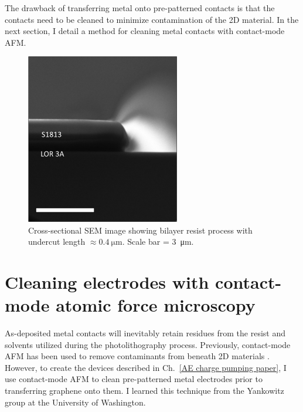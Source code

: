 \documentclass[double,12pt,1in,seploa]{beavtex}
\let\Oldsection\section
\renewcommand{\section}{\FloatBarrier\Oldsection}
\begin{document}
The drawback of transferring metal onto pre-patterned contacts is that the contacts need to be cleaned to minimize contamination of the 2D material. In the next section, I detail a method for cleaning metal contacts with contact-mode AFM.

\begin{figure}
    \includegraphics[width = 0.6\textwidth]{LOR cross section.png}
    \caption{Cross-sectional SEM image showing bilayer resist process with undercut length $\approx \SI{0.4}{\micro\meter}$. Scale bar = \SI{3}{\micro\meter}.}
    \label{fig:cross-section SEM}
\end{figure}

\section{Cleaning electrodes with contact-mode atomic force microscopy} \label{AFM cleaning main section}

As-deposited metal contacts will inevitably retain residues from the resist and solvents utilized during the photolithography process. Previously, contact-mode AFM has been used to remove contaminants from beneath 2D materials \cite{goossens_mechanical_2012,chen_tip-based_2021}. However, to create the devices described in Ch.\ \ref{AE charge pumping paper}, I use contact-mode AFM to clean pre-patterned metal electrodes prior to transferring graphene onto them. I learned this technique from the Yankowitz group at the University of Washington.
\end{document}
